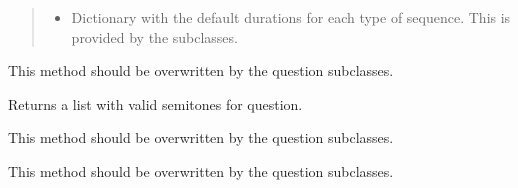 \documentclass[letterpaper,10pt,english]{sphinxmanual}
\begin{document}
\begin{fulllineitems}
\begin{fulllineitems}
\begin{quote}
\begin{description}
\begin{itemize}
\item {} 
 \textendash{} Dictionary with the default durations for
each type of sequence. This is provided by the subclasses.

\end{itemize}

\end{description}\end{quote}

\end{fulllineitems}


\begin{fulllineitems}
\label{\detokenize{index:birdears.questionbase.QuestionBase.check_question}}
This method should be overwritten by the question subclasses.

\end{fulllineitems}


\begin{fulllineitems}
\label{\detokenize{index:birdears.questionbase.QuestionBase.get_valid_semitones}}
Returns a list with valid semitones for question.

\end{fulllineitems}


\begin{fulllineitems}
\label{\detokenize{index:birdears.questionbase.QuestionBase.make_question}}
This method should be overwritten by the question subclasses.

\end{fulllineitems}


\begin{fulllineitems}
\label{\detokenize{index:birdears.questionbase.QuestionBase.make_resolution}}
This method should be overwritten by the question subclasses.


\end{fulllineitems}
\end{fulllineitems}
\end{document}

